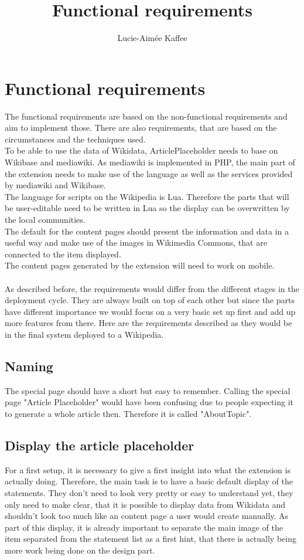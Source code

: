 \documentclass[11pt]{article}
\title {{Functional requirements}}
\author {Lucie-Aim\'{e}e Kaffee}
\date{}
\begin{document}
\listoftodos

\section {Functional requirements}
The functional requirements are based on the non-functional requirements and aim to implement those.
There are also requirements, that are based on the circumstances and the techniques used. \\
To be able to use the data of Wikidata, ArticlePlaceholder needs to base on Wikibase and mediawiki.
As mediawiki is implemented in PHP, the main part of the extension needs to make use of the language as well as the services provided by mediawiki and Wikibase. \\
The language for scripts on the Wikipedia is Lua. Therefore the parts that will be user-editable need to be written in Lua so the display can be overwritten by the local communities. \\
The default for the content pages should present the information and data in a useful way and make use of the images in Wikimedia Commons, that are connected to the item displayed.\\
The content pages generated by the extension will need to work on mobile. \\
\\
As described before, the requirements would differ from the different stages in the deployment cycle. They are always built on top of each other but since the parts have different importance we would focus on a very basic set up first and add up more features from there. Here are the requirements described as they would be in the final system deployed to a Wikipedia.

%

\subsection{Naming}
The special page should have a short but easy to remember. Calling the special page "Article Placeholder" would have been confusing due to people expecting it to generate a whole article then. Therefore it is called "AboutTopic".
\subsection{Display the article placeholder}
For a first setup, it is necessary to give a first insight into what the extension is actually doing. Therefore, the main task is to have a basic default display of the statements. They don't need to look very pretty or easy to understand yet, they only need to make clear, that it is possible to display data from Wikidata and shouldn't look too much like an content page a user would create manually. As part of this display, it is already important to separate the main image of the item separated from the statement list as a first hint, that there is actually being more work being done on the design part. \\
%
\end{document}
